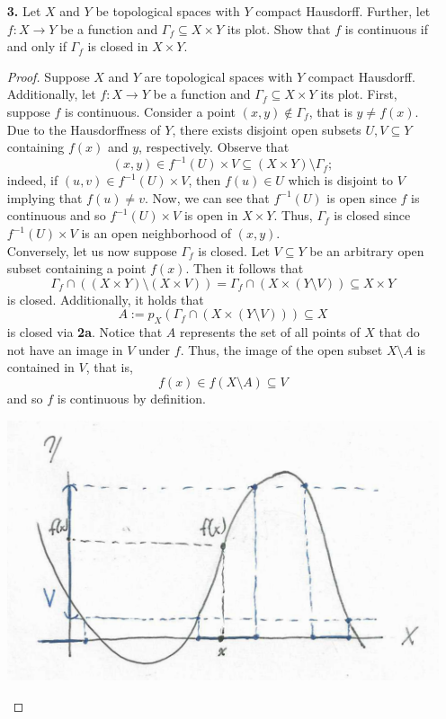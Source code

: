 \documentclass[ 12pt ]{article}
\begin{document}
\begin{enumerate}
	\item[\textbf{3.}] Let $X$ and $Y$ be topological spaces with $Y$ compact Hausdorff. Further, let $f : X \to Y$ be a function and $\Gamma_f \subseteq X \times Y$ its plot. Show that
		$f$ is continuous if and only if $\Gamma_f$ is closed in $X \times Y$.

		\begin{proof}
			Suppose $X$ and $Y$ are topological spaces with $Y$ compact Hausdorff. Additionally, let $f : X \to Y$ be a function and $\Gamma_f \subseteq X \times Y$ its plot. First,
			suppose $f$ is continuous. Consider a point $(x, y) \notin \Gamma_f$, that is $y \neq f(x)$. Due to the Hausdorffness of $Y$, there exists disjoint open subsets $U, V
			\subseteq Y$ containing $f(x)$ and $y$, respectively. Observe that $$(x, y) \in f^{-1}(U) \times V \subseteq (X \times Y) \setminus \Gamma_f;$$ indeed, if $(u, v) \in
			f^{-1}(U) \times V$, then $f(u) \in U$ which is disjoint to $V$ implying that $f(u) \neq v$. Now, we can see that $f^{-1}(U)$ is open since $f$ is continuous and so
			$f^{-1}(U) \times V$ is open in $X \times Y$. Thus, $\Gamma_f$ is closed since $f^{-1}(U) \times V$ is an open neighborhood of $(x, y)$. \\

			Conversely, let us now suppose $\Gamma_f$ is closed. Let $V \subseteq Y$ be an arbitrary open subset containing a point $f(x)$. Then it follows that $$\Gamma_f \cap
			\left ( (X \times Y) \setminus (X \times V) \right ) = \Gamma_f \cap \left ( X \times (Y \setminus V) \right ) \subseteq X \times Y$$ is closed. Additionally, it holds
			that $$A := p_X \left ( \Gamma_f \cap \left ( X \times (Y \setminus V) \right ) \right ) \subseteq X$$ is closed via \textbf{2a}. Notice that $A$ represents the set of
			all points of $X$ that do not have an image in $V$ under $f$. Thus, the image of the open subset $X \setminus A$ is contained in $V$, that is, $$f(x) \in f(X \setminus A)
			\subseteq V$$ and so $f$ is continuous by definition.
			\begin{center}
				\includegraphics[scale=0.5]{Capture}
			\end{center}
		\end{proof}



\end{enumerate}
\end{document}
